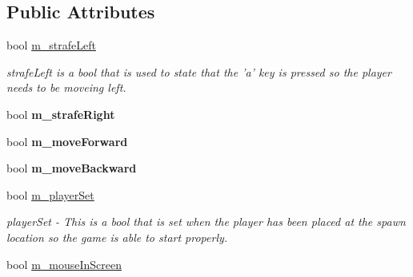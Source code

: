 \subsection*{Public Attributes}
\begin{DoxyCompactItemize}
\item 
bool \hyperlink{classCamera_a6e86bb225fcbe085820f4331d9abe923}{m\_\-strafeLeft}
\begin{DoxyCompactList}\small\item\em strafeLeft is a bool that is used to state that the 'a' key is pressed so the player needs to be moveing left. \item\end{DoxyCompactList}\item 
\hypertarget{classCamera_af554927fd2b80de5b66dcd19b834aa99}{
bool {\bfseries m\_\-strafeRight}}
\label{classCamera_af554927fd2b80de5b66dcd19b834aa99}

\item 
\hypertarget{classCamera_a188ac8c6f0bd240947a8939445a6f747}{
bool {\bfseries m\_\-moveForward}}
\label{classCamera_a188ac8c6f0bd240947a8939445a6f747}

\item 
\hypertarget{classCamera_a9e8dd11b8495eeab694461a44b5f5311}{
bool {\bfseries m\_\-moveBackward}}
\label{classCamera_a9e8dd11b8495eeab694461a44b5f5311}

\item 
\hypertarget{classCamera_a6fdb4a2f1f0918cefe5aa053af7bbc19}{
bool \hyperlink{classCamera_a6fdb4a2f1f0918cefe5aa053af7bbc19}{m\_\-playerSet}}
\label{classCamera_a6fdb4a2f1f0918cefe5aa053af7bbc19}

\begin{DoxyCompactList}\small\item\em playerSet -\/ This is a bool that is set when the player has been placed at the spawn location so the game is able to start properly. \item\end{DoxyCompactList}\item 
\hypertarget{classCamera_a2caa7c5da62eac9eb2e49f4a2a27345d}{
bool \hyperlink{classCamera_a2caa7c5da62eac9eb2e49f4a2a27345d}{m\_\-mouseInScreen}}
\label{classCamera_a2caa7c5da62eac9eb2e49f4a2a27345d}


\end{DoxyCompactItemize}
